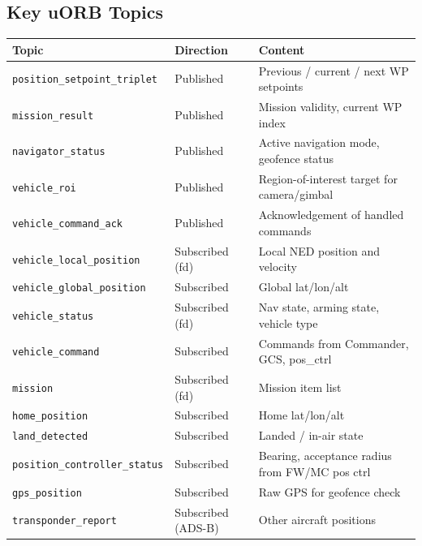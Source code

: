 \documentclass[12pt,a4paper]{article}
\begin{document}
\subsection*{Key uORB Topics}
\begin{center}\begin{tabular}{lll}\toprule
Topic & Direction & Content \\\midrule
\texttt{position\_setpoint\_triplet} & Published & Previous / current / next WP setpoints \\
\texttt{mission\_result} & Published & Mission validity, current WP index \\
\texttt{navigator\_status} & Published & Active navigation mode, geofence status \\
\texttt{vehicle\_roi} & Published & Region-of-interest target for camera/gimbal \\
\texttt{vehicle\_command\_ack} & Published & Acknowledgement of handled commands \\
\texttt{vehicle\_local\_position} & Subscribed (fd) & Local NED position and velocity \\
\texttt{vehicle\_global\_position} & Subscribed & Global lat/lon/alt \\
\texttt{vehicle\_status} & Subscribed (fd) & Nav state, arming state, vehicle type \\
\texttt{vehicle\_command} & Subscribed & Commands from Commander, GCS, pos\_ctrl \\
\texttt{mission} & Subscribed (fd) & Mission item list \\
\texttt{home\_position} & Subscribed & Home lat/lon/alt \\
\texttt{land\_detected} & Subscribed & Landed / in-air state \\
\texttt{position\_controller\_status} & Subscribed & Bearing, acceptance radius from FW/MC pos ctrl \\
\texttt{gps\_position} & Subscribed & Raw GPS for geofence check \\
\texttt{transponder\_report} & Subscribed (ADS-B) & Other aircraft positions \\
\bottomrule\end{tabular}\end{center}
\end{document}

